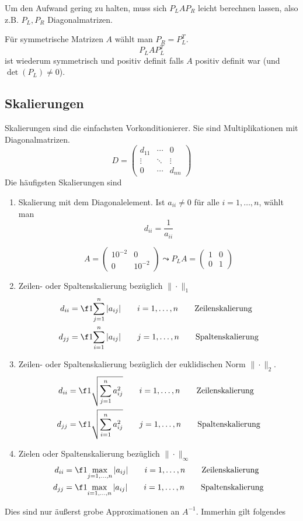 \documentclass[a4paper]{scrartcl}
\numberwithin{equation}{section}
\begin{document}
Um den Aufwand gering zu halten, muss sich $P_LAP_R$ leicht berechnen lassen, also z.B. $P_L,P_R$ Diagonalmatrizen.

Für symmetrische Matrizen $A$ wählt man $P_R=P_L^T$.
\[
	P_LAP_L^T
\]
ist wiederum symmetrisch und positiv definit falls $A$ positiv definit war (und $\det(P_L)\neq 0$).


\subsection{Skalierungen}


Skalierungen sind die einfachsten Vorkonditionierer.
Sie sind Multiplikationen mit Diagonalmatrizen.
\[
	D=\begin{pmatrix}
		d_{11} & \cdots & 0\\
		\vdots & \ddots & \vdots\\
		0 & \cdots & d_{nn}
	\end{pmatrix}
\]
Die häufigsten Skalierungen sind
\begin{enumerate}
	\item
		Skalierung mit dem Diagonalelement.
		Ist $a_{ii}\neq 0$ für alle $i=1,\dotsc,n$, wählt man
		\[
			d_{ii}=\frac 1{a_{ii}}
		\]
		\begin{note}
			\[
			A = \begin{pmatrix}10^{-2} & 0 \\ 0 & 10^{-2}\end{pmatrix} 
			\leadsto P_LA = \begin{pmatrix}1&0\\0&1\end{pmatrix}
			\]
		\end{note}
	\item
		Zeilen- oder Spaltenskalierung bezüglich $\|\cdot\|_1$
		\begin{align*}
			d_{ii} &= \f 1{\sum_{j=1}^n |a_{ij}|} \qquad i=1,\dotsc,n \qquad \text{Zeilenskalierung}\\
			d_{jj} &= \f 1{\sum_{i=1}^n |a_{ij}|} \qquad j=1,\dotsc,n \qquad \text{Spaltenskalierung}
		\end{align*}
	\item
		Zeilen- oder Spaltenskalierung bezüglich der euklidischen Norm $\|\cdot\|_2$.
		\begin{align*}
			d_{ii}&=\f 1{\sqrt{\sum_{j=1}^n a_{ij}^2}} \qquad i=1,\dotsc,n \qquad \text{Zeilenskalierung}\\
			d_{jj}&=\f 1{\sqrt{\sum_{i=1}^n a_{ij}^2}} \qquad j=1,\dotsc,n \qquad \text{Spaltenskalierung}
		\end{align*}
	\item
		Zielen oder Spaltenskalierung bezüglich $\|\cdot\|_\infty$
		\begin{align*}
			d_{ii}&=\f 1{\max_{j=1,\dotsc,n}|a_{ij}|} \qquad i=1,\dotsc,n \qquad \text{Zeilenskalierung}\\
			d_{jj}&=\f 1{\max_{i=1,\dotsc,n}|a_{ij}|} \qquad i=1,\dotsc,n \qquad \text{Spaltenskalierung}
		\end{align*}
\end{enumerate}
Dies sind nur äußerst grobe Approximationen an $A^{-1}$.
Immerhin gilt folgendes
\end{document}
